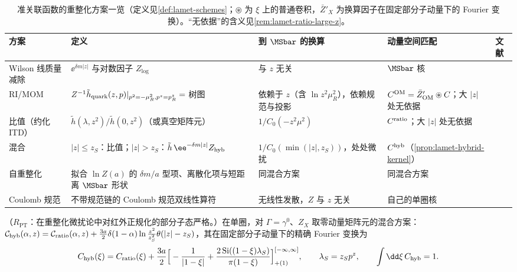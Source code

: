 \begin{table}[htbp]
\centering
\footnotesize
\renewcommand{\arraystretch}{1.12}
\begin{tabularx}{\textwidth}{@{}p{1.9cm}Xp{2.5cm}p{2.6cm}p{2.3cm}@{}}
\toprule
方案 & 定义 & 到 $\MSbar$ 的换算 & 动量空间匹配 & 文献 \\
\midrule
Wilson 线质量减除 & $\ee^{\delta m|z|}$ 与对数因子 $Z_{\log}$ & 与 $z$ 无关 & $\MSbar$ 核 & \cite{Chen:2016fxx,Ishikawa:2016znu,Green:2017xeu} \\
RI/MOM & $Z^{-1}\tilde h_{\rm quark}(z,p)|_{p^2=-\mu_R^2,p^z=p^z_R}=$ 树图 & 依赖于 $z$（含 $\ln z^2\mu_R^2$），依赖规范与投影 & $C^{\rm OM}=\bar Z'_{\rm OM}\circledast C$；大 $|z|$ 处无依据 & \cite{Constantinou:2017sej,Stewart:2017tvs,Alexandrou:2017huk,Chen:2017mzz,LatticeParton:2018gjr} \\
比值（约化 ITD） & $\tilde h(\lambda,z^2)/\tilde h(0,z^2)$（或真空矩阵元） & $1/C_0(-z^2\mu^2)$ & $C^{\rm ratio}$；大 $|z|$ 处无依据 & \cite{Radyushkin2017,Orginos:2017kos,Braun:2018brg} \\
混合 & $|z|\le z_S$：比值；$|z|>z_S$：$\tilde h\,\ee^{-\delta m|z|}Z_{\rm hyb}$ & $1/C_0(\min(|z|,z_S))$，处处微扰 & $C^{\rm hyb}$（\cref{prop:lamet-hybrid-kernel}） & \cite{Ji:2020brr} \\
自重整化 & 拟合 $\ln Z(a)$ 的 $\delta m/a$ 型项、离散化项与短距离 $\MSbar$ 形状 & 同混合方案 & 同混合方案 & \cite{LatticePartonLPC:2021gpi} \\
Coulomb 规范 & 不带规范链的 Coulomb 规范双线性算符 & 无线性发散，$Z$ 与 $z$ 无关 & 自己的单圈核 & \cite{Gao:2023lny,Zhao:2023ptv} \\
\bottomrule
\end{tabularx}
\caption{准关联函数的重整化方案一览（定义见\cref{def:lamet-schemes}；$\circledast$ 为 $\xi$ 上的普通卷积，$\bar Z'_X$ 为换算因子在固定部分子动量下的 Fourier 变换）。“无依据”的含义见\cref{rem:lamet-ratio-large-z}。}
\label{tab:lamet-schemes}
\end{table}

\begin{proposition}\label{prop:lamet-hybrid-kernel}
（$R_{\mathrm{PT}}$：在重整化微扰论中对红外正规化的部分子态严格。）在单圈，对 $\Gamma=\gamma^0$、$Z_X$ 取零动量矩阵元的混合方案：$\mathcal C_{\rm hyb}(\alpha,z)=\mathcal C_{\rm ratio}(\alpha,z)+\frac{3a}2\delta(1-\alpha)\ln\frac{z^2}{z_S^2}\theta(|z|-z_S)$，其在固定部分子动量下的精确 Fourier 变换为
\begin{equation}\label{eq:lamet-hybrid-kernel}
C_{\rm hyb}(\xi)=C_{\rm ratio}(\xi)+\frac{3a}2\Big[-\frac1{|1-\xi|}+\frac{2\,{\rm Si}((1-\xi)\lambda_S)}{\pi(1-\xi)}\Big]^{[-\infty,\infty]}_{+(1)},\qquad\lambda_S=z_Sp^z,\qquad\int\dd\xi\,C_{\rm hyb}=1 .
\end{equation}%
\end{proposition}

